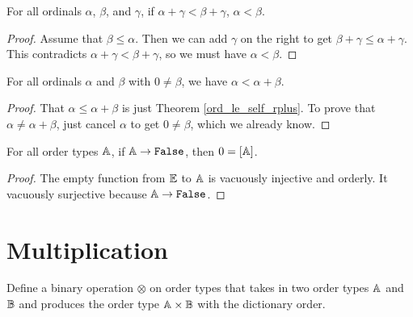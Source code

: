 \documentclass[../../math.tex]{subfiles}
\begin{document}
\begin{theorem} \label{ord_lt_plus_rcancel}
    For all ordinals $\alpha$, $\beta$, and $\gamma$, if $\alpha + \gamma <
    \beta + \gamma$, $\alpha < \beta$.
\end{theorem}
\begin{proof}
    Assume that $\beta \leq \alpha$.  Then we can add $\gamma$ on the right to
    get $\beta + \gamma \leq \alpha + \gamma$.  This contradicts $\alpha +
    \gamma < \beta + \gamma$, so we must have $\alpha < \beta$.
\end{proof}

\begin{theorem} \label{ord_lt_self_rplus}
    For all ordinals $\alpha$ and $\beta$ with $0 \neq \beta$, we have $\alpha <
    \alpha + \beta$.
\end{theorem}
\begin{proof}
    That $\alpha \leq \alpha + \beta$ is just Theorem \ref{ord_le_self_rplus}.
    To prove that $\alpha \neq \alpha + \beta$, just cancel $\alpha$ to get $0
    \neq \beta$, which we already know.
\end{proof}

\begin{theorem} \label{ord_false_0}
    For all order types $\mathbb{A}$, if $\A \to \verb|False|$, then $0 = [\mathbb{A}]$.
\end{theorem}
\begin{proof}
    The empty function from $\mathbb{E}$ to $\mathbb{A}$ is vacuously injective and orderly.  It
    vacuously surjective because $\A \to \verb|False|$.
\end{proof}

\section{Multiplication}

\begin{definition}
    Define a binary operation $\otimes$ on order types that takes in two order
    types $\mathbb{A}$ and $\mathbb{B}$ and produces the order type $\mathbb{A} \times \mathbb{B}$ with the
    dictionary order.
\end{definition}
\end{document}
